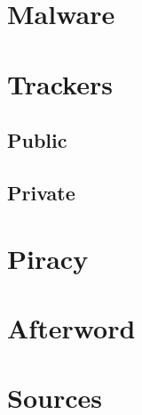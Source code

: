 \documentclass{article}
\begin{document}
\section{Malware}
\section{Trackers}
	\subsection{Public}
	\subsection{Private}
\section{Piracy}
\section{Afterword}
\section{Sources}
\end{document}
